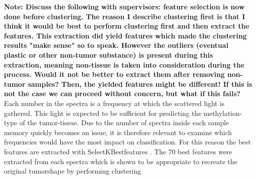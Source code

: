 \textbf{Note: Discuss the following with supervisors: feature selection is now done before clustering. The reason I describe clustering first is that I think it would be best to perform clustering first and then extract the features. This extraction did yield features which made the clustering results "make sense" so to speak. However the outliers (eventual plastic or other non-tumor substance) is present during this extraction, meaning non-tissue is taken into consideration during the process. Would it not be better to extract them after removing non-tumor samples? Then, the yielded features might be different! If this is not the case we can proceed without concern, but what if this fails?}
\\

Each number in the spectra is a frequency at which the scattered light is gathered. This light is expected to be sufficient for predicting the methylation-type of the tumor-tissue. Due to the number of spectra inside each sample memory quickly becomes an issue, it is therefore relevant to examine which frequencies would have the most impact on classification. For this reason the best features are extracted with SelectKBestfeatures \cite{scikit}. The 70 best features were extracted from each spectra which is shown to be appropriate to recreate the original tumorshape by performing clustering 